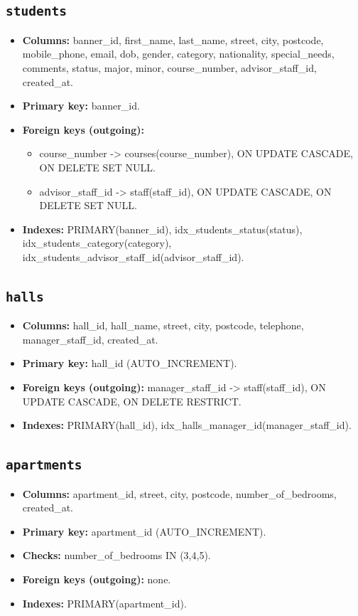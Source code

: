 \documentclass[11pt,a4paper]{article}
\begin{document}
\subsection{\texttt{students}}
\begin{itemize}
  \item \textbf{Columns:} banner\_id, first\_name, last\_name, street, city, postcode, mobile\_phone, email, dob, gender, category, nationality, special\_needs, comments, status, major, minor, course\_number, advisor\_staff\_id, created\_at.
  \item \textbf{Primary key:} banner\_id.
  \item \textbf{Foreign keys (outgoing):}
  \begin{itemize}
    \item course\_number -> courses(course\_number), ON UPDATE CASCADE, ON DELETE SET NULL.
    \item advisor\_staff\_id -> staff(staff\_id), ON UPDATE CASCADE, ON DELETE SET NULL.
  \end{itemize}
  \item \textbf{Indexes:} PRIMARY(banner\_id), idx\_students\_status(status), idx\_students\_category(category), idx\_students\_advisor\_staff\_id(advisor\_staff\_id).
\end{itemize}

\subsection{\texttt{halls}}
\begin{itemize}
  \item \textbf{Columns:} hall\_id, hall\_name, street, city, postcode, telephone, manager\_staff\_id, created\_at.
  \item \textbf{Primary key:} hall\_id (AUTO\_INCREMENT).
  \item \textbf{Foreign keys (outgoing):} manager\_staff\_id -> staff(staff\_id), ON UPDATE CASCADE, ON DELETE RESTRICT.
  \item \textbf{Indexes:} PRIMARY(hall\_id), idx\_halls\_manager\_id(manager\_staff\_id).
\end{itemize}

\subsection{\texttt{apartments}}
\begin{itemize}
  \item \textbf{Columns:} apartment\_id, street, city, postcode, number\_of\_bedrooms, created\_at.
  \item \textbf{Primary key:} apartment\_id (AUTO\_INCREMENT).
  \item \textbf{Checks:} number\_of\_bedrooms IN (3,4,5).
  \item \textbf{Foreign keys (outgoing):} none.
  \item \textbf{Indexes:} PRIMARY(apartment\_id).
\end{itemize}
\end{document}
